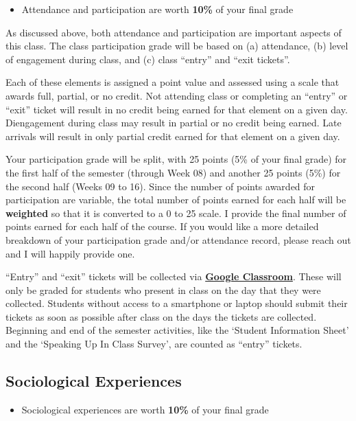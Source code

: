 \documentclass[]{book}
\newenvironment{rmdblock}[1]
  {\begin{shaded*}
  \begin{itemize}
  \renewcommand{\labelitemi}{
    \raisebox{-.7\height}[0pt][0pt]{
      {\setkeys{Gin}{width=3em,keepaspectratio}\texttt{[image: images/\#1]}}
    }
  }
  \item
  }
  {
  \end{itemize}
  \end{shaded*}
  }
\newenvironment{rmdtip}
  {\begin{rmdblock}{tip}}
  {\end{rmdblock}}
\theoremstyle{definition}
\theoremstyle{definition}
\theoremstyle{definition}
\theoremstyle{remark}
\begin{document}
\begin{rmdtip}
Attendance and participation are worth \textbf{10\%} of your final grade
\end{rmdtip}

As discussed above, both attendance and participation are important
aspects of this class. The class participation grade will be based on
(a) attendance, (b) level of engagement during class, and (c) class
``entry'' and ``exit tickets''.

Each of these elements is assigned a point value and assessed using a
scale that awards full, partial, or no credit. Not attending class or
completing an ``entry'' or ``exit'' ticket will result in no credit
being earned for that element on a given day. Diengagement during class
may result in partial or no credit being earned. Late arrivals will
result in only partial credit earned for that element on a given day.

Your participation grade will be split, with 25 points (5\% of your
final grade) for the first half of the semester (through Week 08) and
another 25 points (5\%) for the second half (Weeks 09 to 16). Since the
number of points awarded for participation are variable, the total
number of points earned for each half will be \textbf{weighted} so that
it is converted to a 0 to 25 scale. I provide the final number of points
earned for each half of the course. If you would like a more detailed
breakdown of your participation grade and/or attendance record, please
reach out and I will happily provide one.

``Entry'' and ``exit'' tickets will be collected via
\textbf{\href{https://classroom.google.com}{Google Classroom}}. These
will only be graded for students who present in class on the day that
they were collected. Students without access to a smartphone or laptop
should submit their tickets as soon as possible after class on the days
the tickets are collected. Beginning and end of the semester activities,
like the `Student Information Sheet' and the `Speaking Up In Class
Survey', are counted as ``entry'' tickets.

\hypertarget{sociological-experiences}{%
\subsection{Sociological Experiences}\label{sociological-experiences}}

\begin{rmdtip}
Sociological experiences are worth \textbf{10\%} of your final grade
\end{rmdtip}
\end{document}
